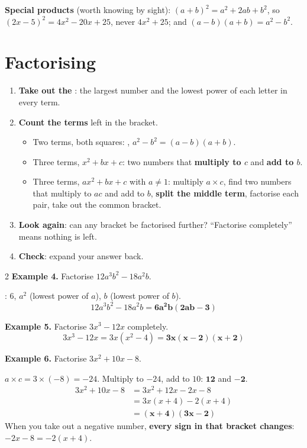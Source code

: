 \documentclass[11pt]{article}
\begin{document}
\textbf{Special products} (worth knowing by sight): $(a+b)^{2} = a^{2} + 2ab + b^{2}$, so $(2x-5)^{2} = 4x^{2} - 20x + 25$, never $4x^{2}+25$; and $(a-b)(a+b) = a^{2} - b^{2}$.

\section{Factorising}\label{h:factorise}
\begin{keybox}[title={Write it in this order (factorising)}]
\begin{enumerate}
\item \textbf{Take out the \Thcf{}}: the largest number and the lowest power of each letter in every term.
\item \textbf{Count the terms} left in the bracket.
  \begin{itemize}
  \item Two terms, both squares: \textbf{\Tdots{}}, $a^{2}-b^{2} = (a-b)(a+b)$.
  \item Three terms, $x^{2}+bx+c$: two numbers that \textbf{multiply to $c$} and \textbf{add to $b$}.
  \item Three terms, $ax^{2}+bx+c$ with $a \neq 1$: multiply $a \times c$, find two numbers that multiply to $ac$ and add to $b$, \textbf{split the middle term}, factorise each pair, take out the common bracket.
  \end{itemize}
\item \textbf{Look again}: can any bracket be factorised further? ``Factorise completely'' means nothing is left.
\item \textbf{Check}: expand your answer back.
\end{enumerate}
\end{keybox}

\begin{multicols}{2}
\textbf{Example 4.} Factorise $12a^{3}b^{2} - 18a^{2}b$.\par
\Thcf{}: $6$, $a^{2}$ (lowest power of $a$), $b$ (lowest power of $b$).
\[ 12a^{3}b^{2} - 18a^{2}b = \mathbf{6a^{2}b(2ab - 3)} \]

\textbf{Example 5.} Factorise $3x^{3} - 12x$ completely.
\[ 3x^{3}-12x = 3x(x^{2}-4) = \mathbf{3x(x-2)(x+2)} \]
\columnbreak

\textbf{Example 6.} Factorise $3x^{2} + 10x - 8$.\par
$a \times c = 3 \times (-8) = -24$. Multiply to $-24$, add to $10$: $\mathbf{12}$ and $\mathbf{-2}$.
\begin{align*}
3x^{2} + 10x - 8 &= 3x^{2} + 12x - 2x - 8\\
&= 3x(x+4) - 2(x+4)\\
&= \mathbf{(x+4)(3x-2)}
\end{align*}
When you take out a negative number, \textbf{every sign in that bracket changes}: $-2x - 8 = -2(x+4)$.
\end{multicols}
\end{document}
